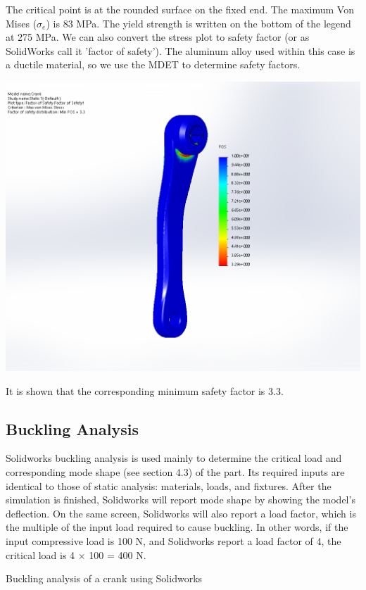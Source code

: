 \documentclass[a4paper,openany,12pt]{book}
\begin{document}
{{The critical point is at the rounded surface on the fixed end. The
maximum Von Mises (\(\sigma_e\)) is 83 MPa. The yield strength is written
on the bottom of the legend at 275 MPa. We can also convert the stress
plot to safety factor (or as SolidWorks call it 'factor of safety'). The
aluminum alloy used within this case is a ductile material, so we use
the MDET to determine safety factors.


\begin{center}
\includegraphics[width=.9\linewidth]{pictures/Intro-CAD/Crank-safety-factor.png}
\end{center}

It is shown that the corresponding minimum safety factor is 3.3.

\subsection{Buckling Analysis}
\label{buckling-analysis}
Solidworks buckling analysis is used mainly to determine the critical
load and corresponding mode shape (see section 4.3) of the part. Its
required inputs are identical to those of static analysis: materials,
loads, and fixtures. After the simulation is finished, Solidworks will
report mode shape by showing the model's deflection. On the same screen,
Solidworks will also report a load factor, which is the multiple of the
input load required to cause buckling. In other words, if the input
compressive load is 100 N, and Solidworks report a load factor of 4, the
critical load is 4 \(\times\) 100 = 400 N.

Buckling analysis of a crank using Solidworks

}}
\end{document}
